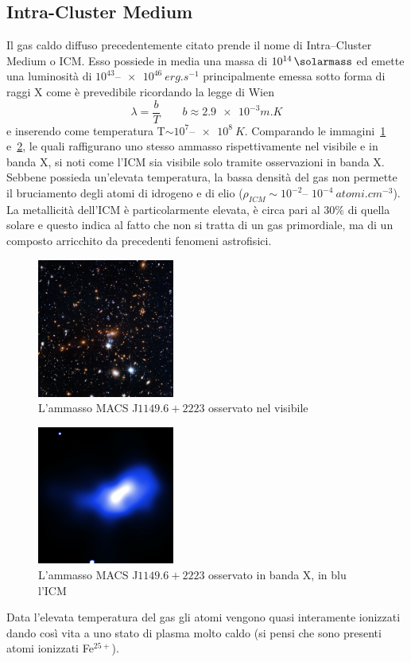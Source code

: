 \subsection{Intra-Cluster Medium}\label{sec:intra-cluster-medium}
Il gas caldo diffuso precedentemente citato prende il nome di Intra--Cluster Medium o ICM. Esso possiede in media una massa di $10^{14}\, \si{\solarmass}$ ed emette una luminosità di $10^{43}$--$\SI{e46}{erg.s^{-1}}$ principalmente emessa sotto forma di raggi X come è prevedibile ricordando la legge di Wien
\begin{equation}
    \lambda = \frac{b}{T} \qquad b \approx \num{2.9e-3} \si{m.K} 
\end{equation}
e inserendo come temperatura T$\sim 10^7$--$\SI{e8}{K}$.
Comparando le immagini~\ref{fig:visible-icm} e~\ref{fig:icm}, le quali raffigurano uno stesso ammasso rispettivamente nel visibile e in banda X, si noti come l'ICM sia visibile solo tramite osservazioni in banda X.
Sebbene possieda un’elevata temperatura, la bassa densità del gas non permette il bruciamento degli atomi di idrogeno e di elio ($\rho_{ICM}\sim 10^{-2}$-- $10^{-4}\:\si{atomi.cm^{-3}}$).
La metallicità dell’ICM è particolarmente elevata, è circa pari al $30\%$ di quella solare e questo indica al fatto che non si tratta di un gas primordiale, ma di un composto arricchito da precedenti fenomeni astrofisici.
\begin{figure}
    \centering
    \includegraphics[width = 0.4\textwidth]{immagini/visible-icm.png}
    \caption{L'ammasso MACS J$1149.6+2223$ osservato nel visibile}
    \label{fig:visible-icm}
\end{figure}
\begin{figure}
    \centering
    \includegraphics[width = 0.4\textwidth]{immagini/icm.png}
    \caption{L'ammasso MACS J$1149.6+2223$ osservato in banda X, in blu l'ICM}
    \label{fig:icm}
\end{figure}
Data l’elevata temperatura del gas gli atomi vengono quasi interamente ionizzati dando così vita a uno stato di plasma molto caldo (si pensi che sono presenti atomi ionizzati Fe$^{25+}$).

